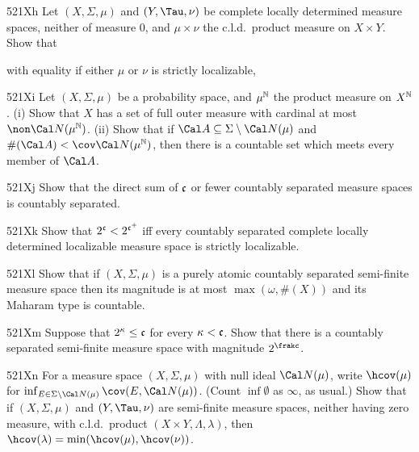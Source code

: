 {\spheader 521Xh Let $(X,\Sigma,\mu)$ and $(Y,\Tau,\nu)$ be complete
locally determined measure spaces, neither of measure $0$,
and $\mu\times\nu$ the c.l.d.\ product measure on $X\times Y$.   Show that



\noindent with equality if either $\mu$ or $\nu$ is strictly localizable,






\spheader 521Xi Let $(X,\Sigma,\mu)$ be a probability space, and
$\mu^{\Bbb N}$ the product measure on $X^{\Bbb N}$.
(i) Show that $X$ has a set of full
outer measure with cardinal at most $\non\Cal N(\mu^{\Bbb N})$.
(ii) Show that if $\Cal A\subseteq\Sigma\setminus\Cal N(\mu)$ and
$\#(\Cal A)<\cov\Cal N(\mu^{\Bbb N})$, then there is a countable set
which meets every member of $\Cal A$.

\spheader 521Xj Show that the direct sum of $\frak c$ or fewer
countably separated measure spaces is countably separated.

\spheader 521Xk Show that $2^{\frak c}<2^{\frak c^+}$ iff every
countably separated complete locally determined localizable measure
space is strictly localizable.  

\spheader 521Xl Show that if $(X,\Sigma,\mu)$ is a purely atomic
countably separated semi-finite measure space then its magnitude is at
most $\max(\omega,\#(X))$ and its Maharam type is countable.

\spheader 521Xm Suppose that $2^{\kappa}\le\frak c$ for every
$\kappa<\frak c$.   Show that there is a countably separated
semi-finite measure space with magnitude $2^{\frakc}$.

\spheader 521Xn For a measure space $(X,\Sigma,\mu)$ with
null ideal $\Cal N(\mu)$, write $\hcov(\mu)$ for
$\inf_{E\in\Sigma\setminus\Cal N(\mu)}\penalty-100\cov(E,\Cal N(\mu))$.
(Count $\inf\emptyset$ as $\infty$, as usual.)
Show that if $(X,\Sigma,\mu)$ and $(Y,\Tau,\nu)$ are semi-finite measure
spaces, neither having zero measure,
with c.l.d.\ product $(X\times Y,\Lambda,\lambda)$,
then $\hcov(\lambda)=\min(\hcov(\mu),\hcov(\nu))$.

}
